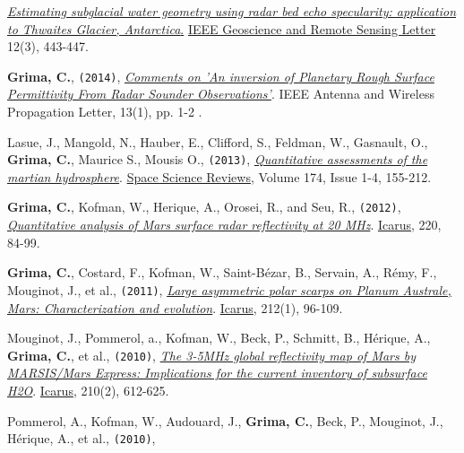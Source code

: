 \begin{etaremune}
  \href{http://ieeexplore.ieee.org/xpl/login.jsp?tp=\&arnumber=6901268\&url=http\%3A\%2F\%2Fieeexplore.ieee.org\%2Fstamp\%2Fstamp.jsp\%3Ftp\%3D\%26arnumber\%3D6901268}{\emph{Estimating
  subglacial water geometry using radar bed echo specularity:
  application to Thwaites Glacier, Antarctica}.} \ul{IEEE Geoscience and
  Remote Sensing Letter} 12(3), 443-447.
\item
  \textbf{Grima, C.}, \texttt{(2014)}, \emph{\href{http://ieeexplore.ieee.org/xpl/articleDetails.jsp?tp=\&arnumber=6827185\&queryText\%3Dgrima}{Comments on 'An inversion of Planetary Rough Surface Permittivity From Radar Sounder Observations'}}. IEEE Antenna and Wireless Propagation Letter, 13(1), pp. 1-2 .
\item
  Lasue, J., Mangold, N., Hauber, E., Clifford, S., Feldman, W.,
  Gasnault, O., \textbf{Grima, C.}, Maurice S., Mousis O.,
  \texttt{(2013)},
  \emph{\href{http://www.ig.utexas.edu/pubs/scripts/readpdf.php?contrib=2628}{Quantitative
  assessments of the martian hydrosphere}}. \ul{Space Science Reviews},
  Volume 174, Issue 1-4, 155-212.
\item
  \textbf{Grima, C.}, Kofman, W., Herique, A., Orosei, R., and Seu, R.,
  \texttt{(2012)},
  \href{http://www.sciencedirect.com/science/article/pii/S0019103512001558}{\emph{Quantitative
  analysis of Mars surface radar reflectivity at 20 MHz}}. \ul{Icarus}, 220,
  84-99.
\item
  \textbf{Grima, C.}, Costard, F., Kofman, W., Saint-Bézar, B., Servain,
  A., Rémy, F., Mouginot, J., et al., \texttt{(2011)},
  \href{http://www.sciencedirect.com/science/article/pii/S0019103510004859}{\emph{Large
  asymmetric polar scarps on Planum Australe, Mars: Characterization and
  evolution}}. \ul{Icarus}, 212(1), 96-109.
\item
  Mouginot, J., Pommerol, a., Kofman, W., Beck, P., Schmitt, B.,
  Hérique, A., \textbf{Grima, C.}, et al., \texttt{(2010)},
  \href{https://www.google.com/url?sa=t\&rct=j\&q=\&esrc=s\&source=web\&cd=1\&cad=rja\&ved=0CDAQFjAA\&url=http\%3A\%2F\%2Fess.uci.edu\%2Fresearchgrp\%2Ferignot\%2Ffiles\%2Fmouginot_icarus_2010.pdf\&ei=j6inUdytH5HA9QSNx4FQ\&usg=AFQjCNHiVV4-tjSgM28QWYY64vKaSa2U4Q\&sig2=fGYDJTm_cOpv0rwZIGDX6A\&bvm=bv.47244034,d.eWU}{
  \emph{The 3-5MHz global reflectivity map of Mars by MARSIS/Mars
  Express: Implications for the current inventory of subsurface H2O}}.
  \ul{Icarus}, 210(2), 612-625.
\item
  Pommerol, A., Kofman, W., Audouard, J., \textbf{Grima, C.}, Beck, P.,
  Mouginot, J., Hérique, A., et al., \texttt{(2010)},

\end{etaremune}

